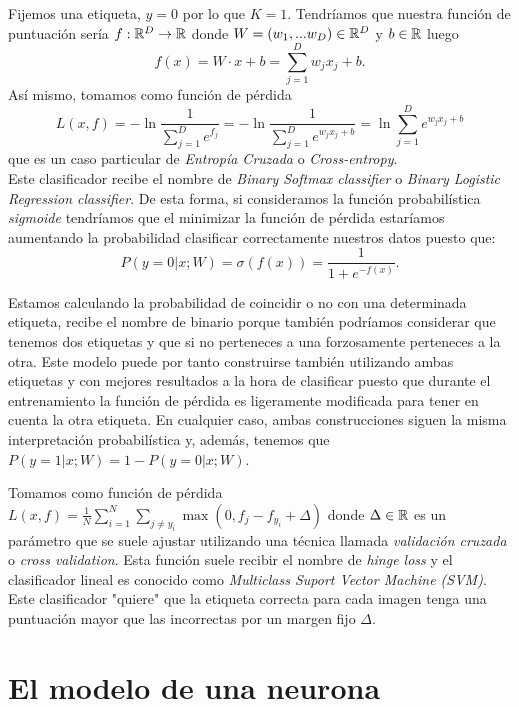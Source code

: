 \begin{ejemplo}\label{SoftMaxBinary}
Fijemos una etiqueta, $y=0$ por lo que $K=1$. Tendríamos que nuestra función de puntuación sería $f:\mathbb{R}^D \to \mathbb{R}$ donde $W=(w_1,...w_D)\in \mathbb{R}^D$ y $b\in \mathbb{R}$ luego $$f(x)=W\cdot x + b = \sum_{j=1}^D w_j x_j+b.$$ Así mismo, tomamos como función de pérdida $$L(x,f)=-\ln \frac{1}{\sum_{j=1}^D e^{f_j}}=-\ln \frac{1}{\sum_{j=1}^D e^{w_j x_j +b}}=\ln\sum_{j=1}^D e^{w_j x_j +b}$$ que es un caso particular de \emph{Entropía Cruzada} o \emph{Cross-entropy}.\\

Este clasificador recibe el nombre de \emph{Binary Softmax classifier} o \emph{Binary Logistic Regression classifier}. De esta forma, si consideramos la función probabilística \emph{sigmoide} tendríamos que el minimizar la función de pérdida estaríamos aumentando la probabilidad clasificar correctamente nuestros datos puesto que: $$P(y=0 | x; W)=\sigma (f(x)) = \frac{1}{1+e^{-f(x)}}.$$

\begin{observacion}
Estamos calculando la probabilidad de coincidir o no con una determinada etiqueta, recibe el nombre de binario porque también podríamos considerar que tenemos dos etiquetas y que si no perteneces a una forzosamente perteneces a la otra. Este modelo puede por tanto construirse también utilizando ambas etiquetas y con mejores resultados a la hora de clasificar puesto que durante el entrenamiento la función de pérdida es ligeramente modificada para tener en cuenta la otra etiqueta. En cualquier caso, ambas construcciones siguen la misma interpretación probabilística y, además, tenemos que $P(y=1 | x; W)=1-P(y=0 | x; W)$.
\end{observacion}
\end{ejemplo}

\begin{ejemplo}\label{SVM}
Tomamos como función de pérdida $L(x,f)=\frac{1}{N} \sum_{i=1}^N \sum_{j \neq y_i} \max(0,f_j-f_y_i + \Delta)$ donde $\Delta \in \mathbb{R}$ es un parámetro que se suele ajustar utilizando una técnica llamada \emph{validación cruzada} o \emph{cross validation}. Esta función suele recibir el nombre de \emph{hinge loss} y el clasificador lineal es conocido como \emph{Multiclass Suport Vector Machine (SVM)}. Este clasificador "quiere" que la etiqueta correcta para cada imagen tenga una puntuación mayor que las incorrectas por un margen fijo $\Delta$.
\end{ejemplo}
\section{El modelo de una neurona}

